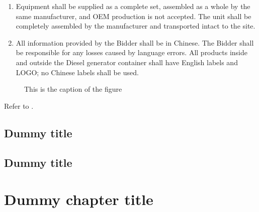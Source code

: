 \documentclass[a4paper,10pt,english,openany,oneside]{sphinxmanual}
\begin{document}
\begin{enumerate}
\item {} 
\sphinxAtStartPar
Equipment shall be supplied as a complete set, assembled as a whole by the same manufacturer, and OEM production is not accepted. The unit shall be completely assembled by the manufacturer and transported intact to the site.

\item {} 
\sphinxAtStartPar
All information provided by the Bidder shall be in Chinese. The Bidder shall be responsible for any losses caused by language errors. All products inside and outside the Diesel generator container shall have English labels and LOGO; no Chinese labels shall be used.

\end{enumerate}

\begin{figure}[htbp]
\centering
\capstart

\noindent{}
\caption{This is the caption of the figure}\label{\detokenize{section1_general:id2}}\label{\detokenize{section1_general:fig-example1}}\end{figure}

\sphinxAtStartPar
Refer to .


\section{Dummy title}
\label{\detokenize{section1_general:dummy-title}}

\section{Dummy title}
\label{\detokenize{section1_general:id1}}
\sphinxstepscope


\chapter{Dummy chapter title}
\label{\detokenize{section2_requirements:dummy-chapter-title}}\label{\detokenize{section2_requirements::doc}}
\end{document}
